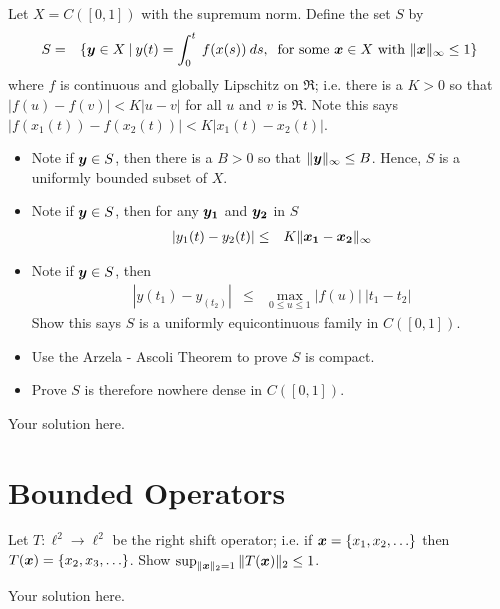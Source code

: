 \documentclass[11pt]{SelfArxOneColBMN}
\begin{document}
\begin{exercise}
Let $X = C([0,1])$ with the supremum norm.
Define the set $S$ by 
\begin{eqnarray*}
S &=& \{ \boldsymbol{y} \in X \: | \: y(t) = \int_0^t \: f(x(s)) \: ds, \: \text{ for some } \boldsymbol{x} \in X \text{ with } \|\boldsymbol{x}\|_\infty \leq 1 \}
\end{eqnarray*}
\noindent
where $f$ is continuous and globally Lipschitz on $\Re$; i.e. there is a $K > 0$ so that
$|f(u) - f(v)| < K |u - v|$ for all $u$ and $v$ is $\Re$.  Note this says
$|f(x_1(t)) - f(x_2(t))| < K|x_1(t) - x_2(t)|$.
\begin{itemize}
\item Note if $\boldsymbol{y} \in S$, then there is a $B > 0$ so that $\|\boldsymbol{y}\|_\infty \leq B $. Hence, $S$ is a uniformly bounded subset of $X$.
\item Note if $\boldsymbol{y} \in S$, then for any $\boldsymbol{y_1}$ and $\boldsymbol{y_2}$ in $S$
\begin{eqnarray*}
|y_1(t)-y_2(t)| &\leq& K \|\boldsymbol{x_1} - \boldsymbol{x_2}\|_\infty 
\end{eqnarray*}
\item Note if $\boldsymbol{y} \in S$, then
\begin{eqnarray*}
|y(t_1)-y_(t_2)| &\leq&   \max_{0 \leq u \leq 1} |f(u)| \: |t_1 - t_2|
\end{eqnarray*}
\noindent
Show this says $S$ is a uniformly equicontinuous family in $C([0,1])$.
\item Use the Arzela - Ascoli Theorem to prove $S$ is compact.
\item Prove $S$ is therefore nowhere dense in $C([0,1])$.
\end{itemize}
\end{exercise}

\begin{solution}
Your solution here.
\end{solution}

\section{Bounded Operators}

\begin{exercise}
Let $T : \ell^2 \rightarrow \ell^2$ be the right shift operator; i.e. if $\boldsymbol{x} = \{x_1, x_2, \ldots \}$
then $T(\boldsymbol{x}) = \{x_2, x_3, \ldots \}$.  Show $\sup_{\|\boldsymbol{x}\|_2 = 1} \|T(\boldsymbol{x})\|_2 \leq 1$.
\end{exercise}

\begin{solution}
Your solution here.
\end{solution}
\end{document}
